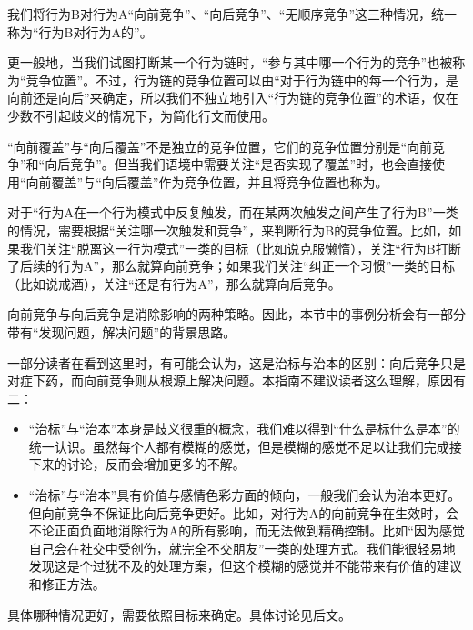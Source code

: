我们将行为B对行为A“向前竞争”、“向后竞争”、“无顺序竞争”这三种情况，统一称为“行为B对行为A的”。
\begin{explain}
更一般地，当我们试图打断某一个行为链时，“参与其中哪一个行为的竞争”也被称为“竞争位置”。不过，行为链的竞争位置可以由“对于行为链中的每一个行为，是向前还是向后”来确定，所以我们不独立地引入“行为链的竞争位置”的术语，仅在少数不引起歧义的情况下，为简化行文而使用。

“向前覆盖”与“向后覆盖”不是独立的竞争位置，它们的竞争位置分别是“向前竞争”和“向后竞争”。但当我们语境中需要关注“是否实现了覆盖”时，也会直接使用“向前覆盖”与“向后覆盖”作为竞争位置，并且将竞争位置也称为。

对于“行为A在一个行为模式中反复触发，而在某两次触发之间产生了行为B”一类的情况，需要根据“关注哪一次触发和竞争”，来判断行为B的竞争位置。比如，如果我们关注“脱离这一行为模式”一类的目标（比如说克服懒惰），关注“行为B打断了后续的行为A”，那么就算向前竞争；如果我们关注“纠正一个习惯”一类的目标（比如说戒酒），关注“还是有行为A”，那么就算向后竞争。

向前竞争与向后竞争是消除影响的两种策略。因此，本节中的事例分析会有一部分带有“发现问题，解决问题”的背景思路。

一部分读者在看到这里时，有可能会认为，这是治标与治本的区别：向后竞争只是对症下药，而向前竞争则从根源上解决问题。本指南不建议读者这么理解，原因有二：
\begin{itemize}
\item “治标”与“治本”本身是歧义很重的概念，我们难以得到“什么是标什么是本”的统一认识。虽然每个人都有模糊的感觉，但是模糊的感觉不足以让我们完成接下来的讨论，反而会增加更多的不解。

\item “治标”与“治本”具有价值与感情色彩方面的倾向，一般我们会认为治本更好。但向前竞争不保证比向后竞争更好。比如，对行为A的向前竞争在生效时，会不论正面负面地消除行为A的所有影响，而无法做到精确控制。比如“因为感觉自己会在社交中受创伤，就完全不交朋友”一类的处理方式。我们能很轻易地发现这是个过犹不及的处理方案，但这个模糊的感觉并不能带来有价值的建议和修正方法。
\end{itemize}
具体哪种情况更好，需要依照目标来确定。具体讨论见后文。
\end{explain}

